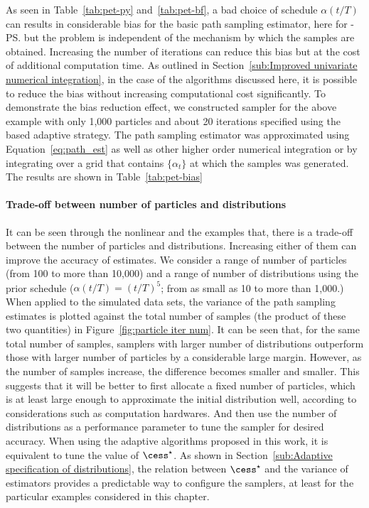

As seen in Table~\ref{tab:pet-py} and~\ref{tab:pet-bf}, a bad choice of
schedule $\alpha(t/T)$ can results in considerable bias for the basic path
sampling estimator, here for \smc[2]-\ps but the problem is independent of the
mechanism by which the samples are obtained. Increasing the number of
iterations can reduce this bias but at the cost of additional computation
time. As outlined in Section~\ref{sub:Improved univariate numerical
  integration}, in the case of the \smc algorithms discussed here, it is
possible to reduce the bias without increasing computational cost
significantly. To demonstrate the bias reduction effect, we constructed \smc
sampler for the above \pet example with only 1,000 particles and about 20
iterations specified using the \cess based adaptive strategy. The path
sampling estimator was approximated using Equation~\eqref{eq:path_est} as well
as other higher order numerical integration or by integrating over a grid that
contains $\{\alpha_t\}$ at which the samples was generated. The results are
shown in Table~\ref{tab:pet-bias}

\paragraph{Trade-off between number of particles and distributions}



It can be seen through the nonlinear \ode and the \pet examples that, there is
a trade-off between the number of particles and distributions. Increasing
either of them can improve the accuracy of estimates. We consider a range of
number of particles (from 100 to more than 10,000) and a range of number of
distributions using the prior schedule ($\alpha(t/T) = (t/T)^5$; from as small
as 10 to more than 1,000.) When applied to the simulated data sets, the
variance of the path sampling estimates is plotted against the total number of
samples (the product of these two quantities) in Figure~\ref{fig:particle iter
  num}. It can be seen that, for the same total number of samples, samplers
with larger number of distributions outperform those with larger number of
particles by a considerable large margin. However, as the number of samples
increase, the difference becomes smaller and smaller. This suggests that it
will be better to first allocate a fixed number of particles, which is at
least large enough to approximate the initial distribution well, according to
considerations such as computation hardwares. And then use the number of
distributions as a performance parameter to tune the sampler for desired
accuracy. When using the adaptive algorithms proposed in this work, it is
equivalent to tune the value of $\cess^\star$. As shown in
Section~\ref{sub:Adaptive specification of distributions}, the relation
between $\cess^\star$ and the variance of estimators provides a predictable
way to configure the samplers, at least for the particular examples considered
in this chapter.

